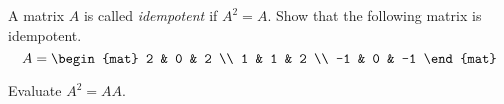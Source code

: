 
\begin{Exercise}[
name={},
title={}, 
difficulty=0,
origin={\cite{KK}}]
A matrix $A$ is called {\em idempotent \em} if $A^{2}=A.$  
Show that the following matrix is idempotent.
\[
A=
\begin{mat}
2 & 0 & 2 \\
1 & 1 & 2 \\
-1 & 0 & -1
\end{mat}
\]
\end{Exercise}

\begin{Answer}
Evaluate $A^2=AA$.
\end{Answer}
